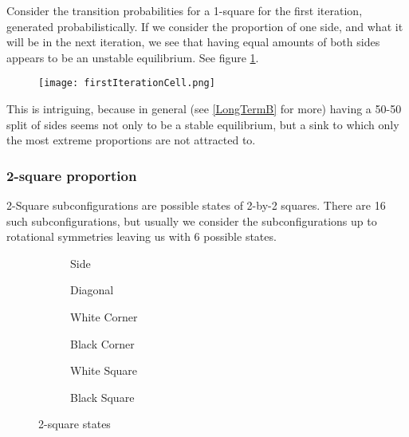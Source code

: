 \documentclass[12pt]{article}
\theoremstyle{definition}
\theoremstyle{remark}
\theoremstyle{remark}
\begin{document}
\par
Consider the transition probabilities for a 1-square for the first iteration, generated probabilistically. If we consider the proportion of one side, and what it will be in the next iteration, we see that having equal amounts of both sides appears to be an unstable equilibrium. See figure \ref{fig:cellFirst}.
\begin{figure}[H]
	\centering
	\texttt{[image: firstIterationCell.png]}
	\caption{}
	\label{fig:cellFirst}
\end{figure}
\par 
This is intriguing, because in general (see \ref{LongTermB} for more) having a 50-50 split of sides seems not only to be a stable equilibrium, but a sink to which only the most extreme proportions are not attracted to.

\subsubsection{2-square proportion} \label{2squareFirst}
\par
2-Square subconfigurations are possible states of 2-by-2 squares. There are 16 such subconfigurations, but usually we consider the subconfigurations up to rotational symmetries leaving us with 6 possible states.

\begin{figure}[H]
  \centering
  \begin{subfigure}[b]{0.3\linewidth}
    \caption{Side}
  \end{subfigure}
  \begin{subfigure}[b]{0.3\linewidth}
    \caption{Diagonal}
  \end{subfigure}
  \begin{subfigure}[b]{0.3\linewidth}
    \caption{White Corner}
  \end{subfigure}
  \begin{subfigure}[b]{0.3\linewidth}
    \caption{Black Corner}
  \end{subfigure}
  \begin{subfigure}[b]{0.3\linewidth}
    \caption{White Square}
  \end{subfigure}
  \begin{subfigure}[b]{0.3\linewidth}
    \caption{Black Square}
  \end{subfigure}
  \caption{2-square states}
\end{figure}
\end{document}
